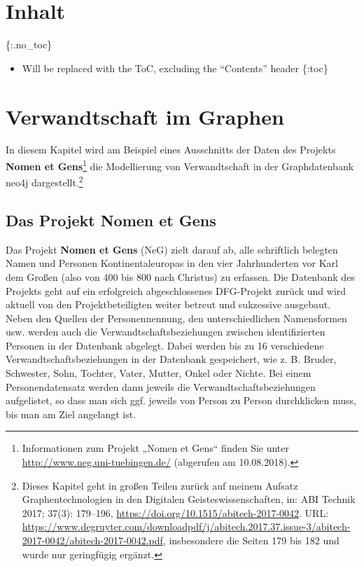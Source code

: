 \documentclass[ngerman,]{scrreprt}
\providecommand{\tightlist}{%
  \setlength{\itemsep}{0pt}\setlength{\parskip}{0pt}}
\begin{document}
\chapter{Inhalt}\label{inhalt-4}

\{:.no\_toc\}

\begin{itemize}
\tightlist
\item
  Will be replaced with the ToC, excluding the ``Contents'' header \{:toc\}
\end{itemize}

\chapter{Verwandtschaft im Graphen}\label{verwandtschaft-im-graphen}

In diesem Kapitel wird am Beispiel eines Ausschnitts der Daten des Projekts \textbf{Nomen et Gens}\footnote{Informationen zum Projekt „Nomen et Gens`` finden Sie unter \url{http://www.neg.uni-tuebingen.de/} (abgerufen am 10.08.2018).} die Modellierung von Verwandtschaft in der Graphdatenbank neo4j dargestellt.\footnote{Dieses Kapitel geht in großen Teilen zurück auf meinem Aufsatz Graphentechnologien in den Digitalen Geisteswissenschaften, in: ABI Technik 2017; 37(3): 179--196, \url{https://doi.org/10.1515/abitech-2017-0042}. URL: \url{https://www.degruyter.com/downloadpdf/j/abitech.2017.37.issue-3/abitech-2017-0042/abitech-2017-0042.pdf}, insbesondere die Seiten 179 bis 182 und wurde nur geringfügig ergänzt.}

\section{Das Projekt Nomen et Gens}\label{das-projekt-nomen-et-gens}

Das Projekt \textbf{Nomen et Gens} (NeG) zielt darauf ab, alle schriftlich belegten Namen und Personen Kontinentaleuropas in den vier Jahrhunderten vor Karl dem Großen (also von 400 bis 800 nach Christus) zu erfassen. Die Datenbank des Projekts geht auf ein erfolgreich abgeschlossenes DFG-Projekt zurück und wird aktuell von den Projektbeteiligten weiter betreut und sukzessive ausgebaut. Neben den Quellen der Personennennung, den unterschiedlichen Namensformen usw. werden auch die Verwandtschaftsbeziehungen zwischen identifizierten Personen in der Datenbank abgelegt. Dabei werden bis zu 16 verschiedene Verwandtschaftsbeziehungen in der Datenbank gespeichert, wie z. B. Bruder, Schwester, Sohn, Tochter, Vater, Mutter, Onkel oder Nichte. Bei einem Personendatensatz werden dann jeweils die Verwandtschaftsbeziehungen aufgelistet, so dass man sich ggf. jeweils von Person zu Person durchklicken muss, bis man am Ziel angelangt ist.
\end{document}

